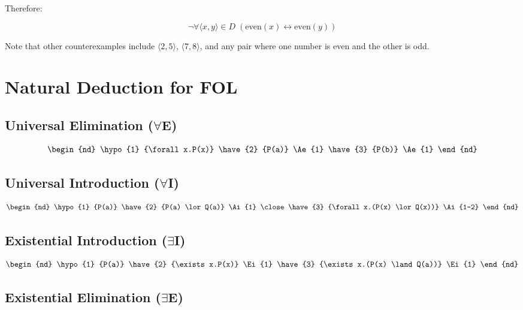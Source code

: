 \documentclass[12pt,a4paper,openany]{article}
\begin{document}
Therefore:

\[\boxed{\neg \forall \langle x,y \rangle \in D \;(\text{even}(x) \leftrightarrow \text{even}(y))}\]

Note that other counterexamples include \(\langle 2,5 \rangle\),
\(\langle 7,8 \rangle\), and any pair where one number is even and the
other is odd.



\section{Natural Deduction for FOL}


\subsection{Universal Elimination ($\forall$E)}\label{sec:universal-elimination}

\[
\begin{nd}
  \hypo {1} {\forall x.P(x)}
  \have {2} {P(a)}                       \Ae{1}
  \have {3} {P(b)}                       \Ae{1}
\end{nd}
\]


\subsection{Universal Introduction ($\forall$I)}\label{sec:universal-introduction}

\[
\begin{nd}
  \hypo {1} {P(a)}
  \have {2} {P(a) \lor Q(a)}             \Ai{1}
  \close
  \have {3} {\forall x.(P(x) \lor Q(x))} \Ai{1-2}
\end{nd}
\]

\subsection{Existential Introduction ($\exists$I)}\label{sec:existential-introduction}

\[
\begin{nd}
  \hypo {1} {P(a)}
  \have {2} {\exists x.P(x)}             \Ei{1}
  \have {3} {\exists x.(P(x) \land Q(a))} \Ei{1}
\end{nd}
\]

\subsection{Existential Elimination ($\exists$E)}\label{sec:existential-elimination}
\end{document}
